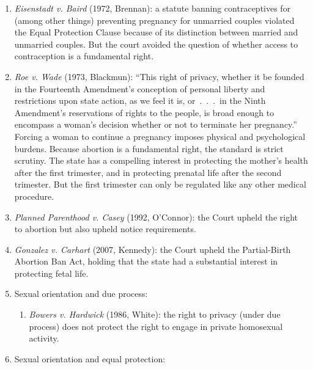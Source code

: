 \begin{enumerate}
\begin{enumerate}
        illicit relationships)---but it's not.
        \item Black, dissenting: there is no fundamental constitutional right 
        to privacy. The Court cannot reliably discern ``fundamental principles 
        of liberty and justice.''\footnote{Casebook p. 1351.}
    \end{enumerate}
    \item \emph{Eisenstadt v. Baird} (1972, Brennan): a statute banning 
    contraceptives for (among other things) preventing pregnancy for unmarried 
    couples violated the Equal Protection Clause because of its distinction 
    between married and unmarried couples. But the court avoided the question 
    of whether access to contraception is a fundamental right.
    \item \emph{Roe v. Wade} (1973, Blackmun): ``This right of privacy, 
    whether it be founded in the Fourteenth Amendment's conception of personal 
    liberty and restrictions upon state action, as we feel it is, or~.~.~.~in 
    the Ninth Amendment's reservations of rights to the people, is broad 
    enough to encompass a woman's decision whether or not to terminate her 
    pregnancy.'' Forcing a woman to continue a pregnancy imposes physical and 
    psychological burdens. Because abortion is a fundamental right, the 
    standard is strict scrutiny. The state has a compelling interest in 
    protecting the mother's health after the first trimester, and in 
    protecting prenatal life after the second trimester. But the first 
    trimester can only be regulated like any other medical procedure.
    \item \emph{Planned Parenthood v. Casey} (1992, O'Connor): the Court 
    upheld the right to abortion but also upheld notice requirements.
    \item \emph{Gonzalez v. Carhart} (2007, Kennedy): the Court upheld the 
    Partial-Birth Abortion Ban Act, holding that the state had a substantial 
    interest in protecting fetal life.
    \item Sexual orientation and due process:
    \begin{enumerate}
        \item \emph{Bowers v.  Hardwick} (1986, White): the right to privacy 
        (under due process) does not protect the right to engage in private 
        homosexual activity. 
    \end{enumerate}
    \item Sexual orientation and equal protection:
    \begin{enumerate}

\end{enumerate}
\end{enumerate}
